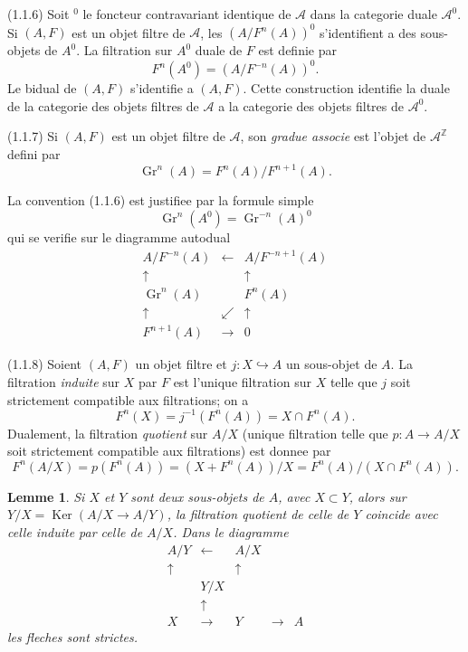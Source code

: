 \documentclass[11pt,a4paper]{amsart}
\theoremstyle{plain}
\newtheorem{lemma}[theorem]{Lemme}
\theoremstyle{definition}
\theoremstyle{remark}
\DeclareMathOperator{\Gr}{Gr}
\DeclareMathOperator{\Ker}{Ker}
\newcommand{\sA}{\mathscr{A}}
\newcommand{\bZ}{\mathbb{Z}}
\numberwithin{equation}{subsection}
\begin{document}
(1.1.6) Soit $^0$ le foncteur contravariant identique de $\sA$ dans la categorie duale $\sA^0$.
Si $(A, F)$ est un objet filtre de $\sA$, les $(A/F^n(A))^0$ s'identifient a des sous-objets de $A^0$.
La filtration sur $A^0$ duale de $F$ est definie par
\[
F^n(A^0) = (A/F^{-n}(A))^0.
\]
Le bidual de $(A, F)$ s'identifie a $(A, F)$. Cette construction identifie la duale de
la categorie des objets filtres de $\sA$ a la categorie des objets filtres de $\sA^0$.

(1.1.7) Si $(A, F)$ est un objet filtre de $\sA$, son \emph{gradue associe} est l'objet de $\sA^{\bZ}$
defini par
\[
\Gr^n(A) = F^n(A)/F^{n+1}(A).
\]

La convention (1.1.6) est justifiee par la formule simple
\[
\Gr^n(A^0) = \Gr^{-n}(A)^0
\]
qui se verifie sur le diagramme autodual
\[
\begin{array}{ccc}
A/F^{-n}(A) & \longleftarrow & A/F^{-n+1}(A) \\
\uparrow & & \uparrow \\
\Gr^n(A) & & F^n(A) \\
\uparrow & \swarrow & \uparrow \\
F^{n+1}(A) & \longrightarrow & 0
\end{array}
\tag{1.1.7.1}
\]

(1.1.8) Soient $(A, F)$ un objet filtre et $j : X \hookrightarrow A$ un sous-objet de $A$. La filtration
\emph{induite} sur $X$ par $F$ est l'unique filtration sur $X$ telle que $j$ soit strictement compatible
aux filtrations; on a
\[
F^n(X) = j^{-1}(F^n(A)) = X \cap F^n(A).
\]
Dualement, la filtration \emph{quotient} sur $A/X$ (unique filtration telle que $p : A \to A/X$
soit strictement compatible aux filtrations) est donnee par
\[
F^n(A/X) = p(F^n(A)) = (X+F^n(A))/X = F^n(A)/(X \cap F^n(A)).
\]

\begin{lemma}\label{lem:1.1.9}
Si $X$ et $Y$ sont deux sous-objets de $A$, avec $X \subset Y$,
alors sur $Y/X = \Ker(A/X \to A/Y)$, la filtration quotient de celle de $Y$ coincide avec celle induite par celle
de $A/X$. Dans le diagramme
\[
\begin{array}{ccccc}
A/Y & \longleftarrow & A/X & & \\
\uparrow & & \uparrow & & \\
& Y/X & & & \\
& \uparrow & & & \\
X & \longrightarrow & Y & \longrightarrow & A
\end{array}
\]
les fleches sont strictes.
\end{lemma}
\end{document}
